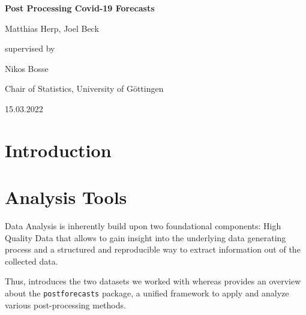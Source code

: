\documentclass[
]{article}
\author{}
\date{\vspace{-2.5em}}
\begin{document}
\begin{titlepage}
  \begin{center}
    \vspace*{1cm}
    
    \Huge
    \textbf{Post Processing Covid-19 Forecasts}
    
    \vspace{1.5cm}
    
    Matthias Herp, Joel Beck
    
    \vspace{1.5cm}
    
    \Large
    supervised by
    
    \vspace{0.5cm}
    
    Nikos Bosse
    
    \vspace{2.5cm}
    
    Chair of Statistics, University of G\"ottingen
    
    \vspace{0.5cm}
    
    15.03.2022
            
  \end{center}
\end{titlepage}

\newpage

\renewcommand{\contentsname}{Table of Contents}
\tableofcontents

\newpage


\hypertarget{introduction}{%
\section*{Introduction}\label{introduction}}

\newpage

\hypertarget{analysis-tools}{%
\section{Analysis Tools}\label{analysis-tools}}

Data Analysis is inherently build upon two foundational components: High Quality Data that allows to gain insight into the underlying data generating process and a structured and reproducible way to extract information out of the collected data.

Thus,  introduces the two datasets we worked with whereas  provides an overview about the \texttt{postforecasts} package, a unified framework to apply and analyze various post-processing methods.
\end{document}
